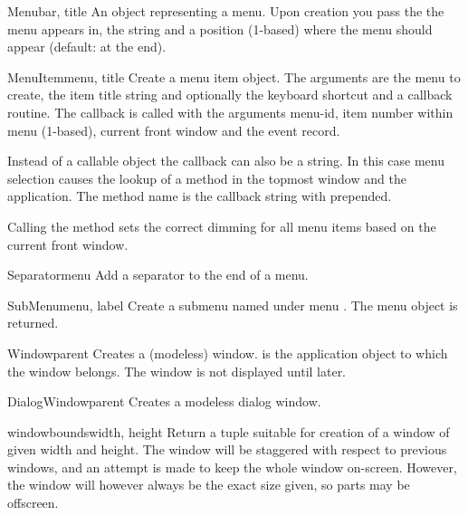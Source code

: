\begin{funcdesc}{Menu}{bar, title}
An object representing a menu. Upon creation you pass the
 the menu appears in, the  string and a
position (1-based)  where the menu should appear (default:
at the end).
\end{funcdesc}

\begin{funcdesc}{MenuItem}{menu, title}
Create a menu item object. The arguments are the menu to create, the
item title string and optionally the keyboard shortcut
and a callback routine. The callback is called with the arguments
menu-id, item number within menu (1-based), current front window and
the event record.

Instead of a callable object the callback can also be a string. In
this case menu selection causes the lookup of a method in the topmost
window and the application. The method name is the callback string
with  prepended.

Calling the   method sets the
correct dimming for all menu items based on the current front window.
\end{funcdesc}

\begin{funcdesc}{Separator}{menu}
Add a separator to the end of a menu.
\end{funcdesc}

\begin{funcdesc}{SubMenu}{menu, label}
Create a submenu named  under menu . The menu
object is returned.
\end{funcdesc}

\begin{funcdesc}{Window}{parent}
Creates a (modeless) window.  is the application object to
which the window belongs. The window is not displayed until later.
\end{funcdesc}

\begin{funcdesc}{DialogWindow}{parent}
Creates a modeless dialog window.
\end{funcdesc}

\begin{funcdesc}{windowbounds}{width, height}
Return a 
tuple suitable for creation of a window of given width and height. The
window will be staggered with respect to previous windows, and an
attempt is made to keep the whole window on-screen. However, the window will
however always be the exact size given, so parts may be offscreen.
\end{funcdesc}

